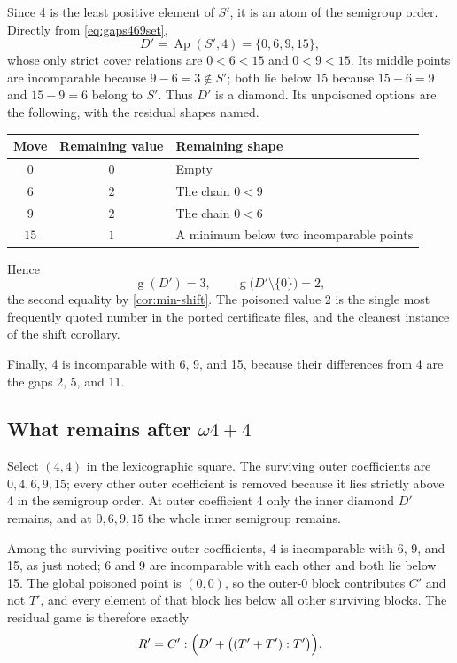 \documentclass[11pt,letterpaper]{article}
\numberwithin{equation}{section}
\theoremstyle{definition}
\theoremstyle{remark}
\newcommand{\sg}{\operatorname{g}}
\newcommand{\Ap}{\operatorname{Ap}}
\begin{document}
Since 4 is the least positive element of $S'$, it is an atom of the
semigroup order. Directly from \cref{eq:gaps469set},
\begin{equation}\label{eq:diamond469}
 D'=\Ap(S',4)=\{0,6,9,15\},
\end{equation}
whose only strict cover relations are $0<6<15$ and $0<9<15$. Its middle
points are incomparable because $9-6=3\notin S'$; both lie below 15
because $15-6=9$ and $15-9=6$ belong to $S'$. Thus $D'$ is a diamond.
Its unpoisoned options are the following, with the residual shapes named.
\begin{center}
\begin{tabular}{ccl}
\toprule
Move & Remaining value & Remaining shape\\
\midrule
$0$ & $0$ & Empty\\
$6$ & $2$ & The chain $0<9$\\
$9$ & $2$ & The chain $0<6$\\
$15$ & $1$ & A minimum below two incomparable points\\
\bottomrule
\end{tabular}
\end{center}
Hence
\begin{equation}\label{eq:diamond469-value}
 \sg(D')=3,\qquad \sg\bigl(D'\setminus\{0\}\bigr)=2,
\end{equation}
the second equality by \cref{cor:min-shift}. The poisoned value 2 is the
single most frequently quoted number in the ported certificate files, and
the cleanest instance of the shift corollary.

Finally, 4 is incomparable with 6, 9, and 15, because their differences
from 4 are the gaps 2, 5, and 11.

\subsection{What remains after \texorpdfstring{$\omega4+4$}{omega*4+4}}
\label{sec:residual469}

Select $(4,4)$ in the lexicographic square. The surviving outer
coefficients are $0,4,6,9,15$; every other outer coefficient is removed
because it lies strictly above 4 in the semigroup order. At outer
coefficient 4 only the inner diamond $D'$ remains, and at $0,6,9,15$ the
whole inner semigroup remains.

Among the surviving positive outer coefficients, 4 is incomparable with
6, 9, and 15, as just noted; 6 and 9 are incomparable with each other and
both lie below 15. The global poisoned point is $(0,0)$, so the outer-0
block contributes $C'$ and not $T'$, and every element of that block lies
below all other surviving blocks. The residual game is therefore exactly
\begin{equation}\label{eq:residual469}
 R'=C':\Bigl(D'+\bigl((T'+T'):T'\bigr)\Bigr).
\end{equation}
\end{document}
